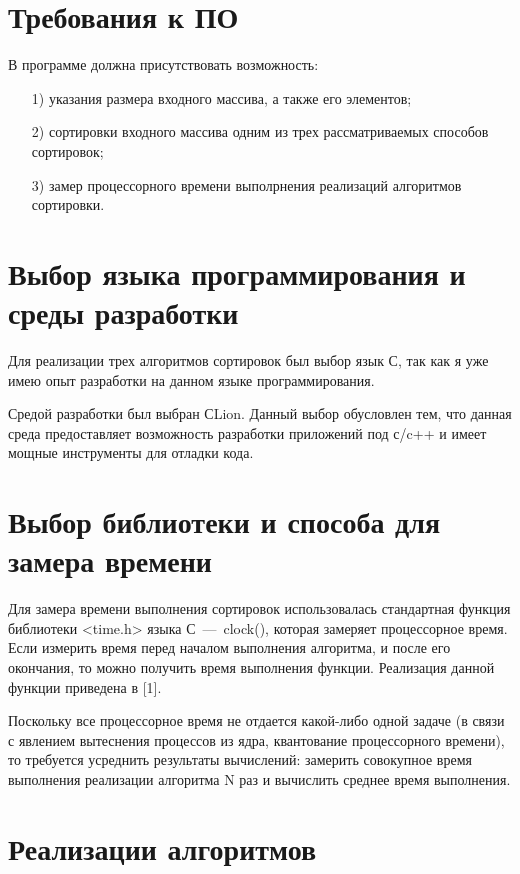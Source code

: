 \documentclass[12pt]{report}
\begin{document}
	\section{Требования к ПО}
	
	В программе должна присутствовать возможность:
	
	\begin{enumerate}
		\item[1)] указания размера входного массива, а также его элементов;
		\item[2)] сортировки входного массива одним из трех рассматриваемых способов сортировок;
		\item[3)] замер процессорного времени выполрнения реализаций алгоритмов сортировки.
	\end{enumerate}
	
	\section{Выбор языка программирования и среды разработки}
	
	Для реализации трех алгоритмов сортировок был выбор язык С, так как я уже имею опыт разработки на данном языке программирования.

	Средой разработки был выбран СLion. Данный выбор обусловлен тем, что данная среда предоставляет возможность разработки приложений под с/c++ и имеет мощные инструменты для отладки кода. 
	
	\section{Выбор библиотеки и способа для замера времени}
		Для замера времени выполнения сортировок использовалась стандартная функция библиотеки <time.h> языка С~---~clock(), которая замеряет процессорное время. Если измерить время перед началом выполнения алгоритма, и после его окончания, то можно получить время выполнения функции. Реализация данной функции приведена в [1].
		
		Поскольку все процессорное время не отдается какой-либо одной задаче (в связи с явлением вытеснения процессов из ядра, квантование процессорного времени), то требуется усреднить результаты вычислений: замерить совокупное время выполнения реализации алгоритма N раз и вычислить среднее время выполнения.
		
	\section{Реализации алгоритмов}
	
\end{document}
